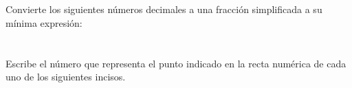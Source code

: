 \documentclass[12pt,addpoints]{evalua}
\begin{document}
\begin{questions}
    \subsection*{\else{}\fi}
    \question[4] Convierte los siguientes números decimales a una fracción simplificada a su mínima expresión:
    \begin{multicols}{2}
    \end{multicols}

    \newpage

    \section*{\else{}\fi}
    \subsection*{\else{}\fi}
    \question[4] Escribe el número que representa el punto indicado en la recta numérica de cada uno de los siguientes incisos.

    \begin{multicols}{2}
    \end{multicols}


\end{questions}
\end{document}
